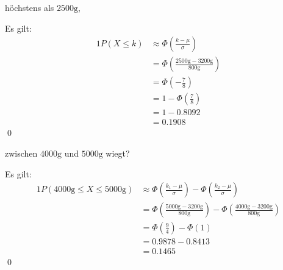 \documentclass{abgabe}
\begin{document}
\begin{questions}
\begin{parts}
\begin{subparts}
            \subpart
            höchstens als $2500\si{\g}$,
            \begin{solution}
                Es gilt:
                \begin{alignat*}{1}
                    P(X \leq k) & \approx \Phi \left( \frac{k-\mu}{\sigma} \right)                                                  \\
                                & =                                  \Phi \left( \frac{2500\si{\g}-3200\si{\g}}{800\si{\g}} \right) \\
                                & =                                  \Phi \left( - \frac{7}{8} \right)                              \\
                                & =                                  1 - \Phi \left( \frac{7}{8} \right)                            \\
                                & =                                  1 - 0.8092                                                     \\
                                & =                                  0.1908
                \end{alignat*}
                \qed
            \end{solution}

            \newpage
            \subpart
            zwischen $4000\si{\g}$ und $5000\si{\g}$ wiegt?
            \begin{solution}
                Es gilt:
                \begin{alignat*}{1}
                    P(4000\si{\g} \leq X \leq 5000\si{\g}) & \approx \Phi \left( \frac{k_1-\mu}{\sigma} \right) -  \Phi \left( \frac{k_2-\mu}{\sigma} \right)                                   \\
                                                           & = \Phi \left( \frac{5000\si{\g}-3200\si{\g}}{800\si{\g}} \right) -  \Phi \left( \frac{4000\si{\g}-3200\si{\g}}{800\si{\g}} \right) \\
                                                           & = \Phi \left( \frac{9}{4} \right) -  \Phi \left( 1 \right)                                                                         \\
                                                           & = 0.9878 -  0.8413                                                                                                                 \\
                                                           & = 0.1465
                \end{alignat*}
                \qed
            \end{solution}
        \end{subparts}


\end{parts}
\end{questions}
\end{document}
